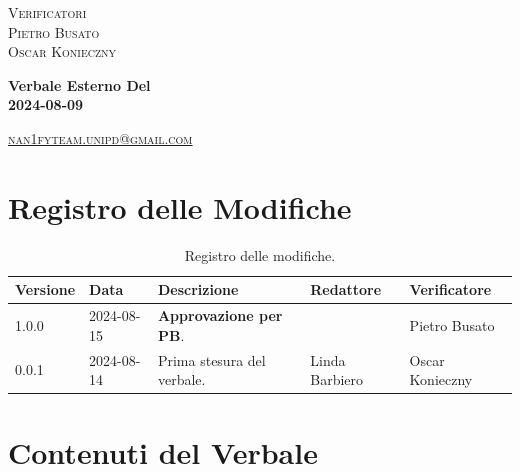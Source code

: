 \documentclass[8pt]{article}
\begin{document}
\begin{titlepage}
\begin{minipage}[t]{0.47\textwidth}
		{\large{\textsc{Verificatori}}
			\vspace{3mm}
			{\\\large{\textsc{Pietro Busato}\\}} %
			{\large{\textsc{Oscar Konieczny}}}
			
		}
		\vspace{4mm}\vspace{4mm}
	\end{minipage}
	\vspace{4cm}
	\begin{center}
		\begin{flushright}
			{\fontsize{30pt}{52pt}\selectfont \textbf{Verbale Esterno Del\\2024-08-09\\}} %
		\end{flushright}
		\vspace{3cm}
	\end{center}
	\vspace{8.5 cm}
	{\small \textsc{\href{mailto: nan1fyteam.unipd@gmail.com}{nan1fyteam.unipd@gmail.com}}}
\end{titlepage}
\pagestyle{mystyle}
\section*{Registro delle Modifiche}
\begin{table}[ht!]	
	\centering
	\begin{tabular}{p{1.2cm} p{2cm} p{5cm} p{3cm} p{3cm}}
		\toprule
		\textbf{Versione}& \textbf{Data} & \textbf{Descrizione} & \textbf{Redattore} & \textbf{Verificatore} \\
		\midrule
		1.0.0 & 2024-08-15 & \textbf{Approvazione per PB}. & & Pietro Busato \\
		0.0.1 & 2024-08-14 & Prima stesura del verbale. & Linda Barbiero & Oscar Konieczny \\
		\bottomrule
	\end{tabular}
	\caption{Registro delle modifiche.}
	\label{table:Registro delle modifiche}
\end{table}
\newpage
\tableofcontents
\clearpage
\newpage
\justifying
\section{Contenuti del Verbale}
\end{document}
